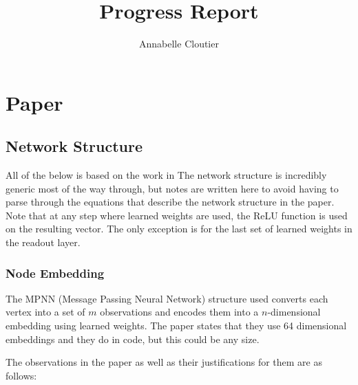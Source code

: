 \documentclass{article}
\title{Progress Report}
\author{Annabelle Cloutier}
\begin{document}
\maketitle

\tableofcontents

\section{Paper}

\subsection{Network Structure}

All of the below is based on the work in \cite{eco-dqn}
The network structure is incredibly generic most of the way through, but notes are written here to avoid having to parse through the equations that describe the network structure in the paper. Note that at any step where learned weights are used, the ReLU function is used on the resulting vector. The only exception is for the last set of learned weights in the readout layer.

\subsubsection{Node Embedding}\label{node-embedding}

The MPNN (Message Passing Neural Network) structure used converts each vertex into a set of $m$ observations and encodes them into a $n$-dimensional embedding using learned weights. The paper states that they use 64 dimensional embeddings and they do in code, but this could be any size. 

The observations in the paper as well as their justifications for them are as follows: 
\end{document}
